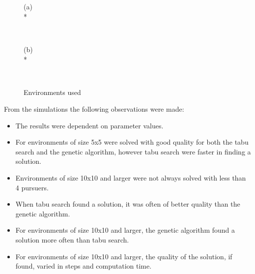 \begin{figure}[t!hb]
\begin{center}
(a)\\*
\begin{tabular}{| p{0.1cm} | p{0.1cm} | p{0.1cm} | p{0.1cm} | p{0.1cm} | p{0.1cm} | p{0.1cm} | p{0.1cm} | p{0.1cm} | p{0.1cm} | }
\hline
 
\hline
\end{tabular}
\hspace{0.5cm}
\begin{tabular}{| p{0.1cm} | p{0.1cm} | p{0.1cm} | p{0.1cm} | p{0.1cm} | p{0.1cm} | p{0.1cm} | p{0.1cm} | p{0.1cm} | p{0.1cm} | }
\hline
 
\hline
\end{tabular}
\end{center}
\vspace{0.05cm}
\begin{center}
(b)\\*
\begin{tabular}{| p{0.1cm} | p{0.1cm} | p{0.1cm} | p{0.1cm} | p{0.1cm} | p{0.1cm} | p{0.1cm} | p{0.1cm} | p{0.1cm} | p{0.1cm} | }
\hline
 
\hline
\end{tabular}
\hspace{0.5cm}
\begin{tabular}{| p{0.1cm} | p{0.1cm} | p{0.1cm} | p{0.1cm} | p{0.1cm} | p{0.1cm} | p{0.1cm} | p{0.1cm} | p{0.1cm} | p{0.1cm} | }
\hline
 
\hline
\end{tabular}
\end{center}
\caption{Environments used}
\label{Envs}
\end{figure}
\newpage From the simulations the following observations were made:
\begin{itemize}
\item{The results were dependent on parameter values.}
\item{For environments of size 5x5 were solved with good quality for both the tabu search and the genetic algorithm, however tabu search were faster in finding a solution.}
\item{Environments of size 10x10 and larger were not always solved with less than 4 pursuers.}
\item{When tabu search found a solution, it was often of better quality than the genetic algorithm.}
\item{For environments of size 10x10 and larger, the genetic algorithm found a solution more often than tabu search.}
\item{For environments of size 10x10 and larger, the quality of the solution, if found, varied in steps and computation time.}
\end{itemize}

